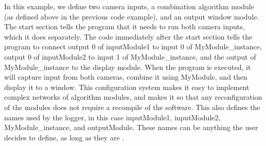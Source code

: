 \documentclass[letterpaper,10pt,titlepage]{IEEEtran}
\begin{document}
   In this example, we define two camera inputs, a combination algorithm module (as defined above in the previous code example), and an output window module. The start section tells the program that it needs to run both camera inputs, which it does separately. The code immediately after the start section tells the program to connect output 0 of inputModule1 to input 0 of MyModule\_instance, output 0 of inputModule2 to input 1 of MyModule\_instance, and the output of MyModule\_instance to the display module. When the program is executed, it will capture input from both cameras, combine it using MyModule, and then display it to a window. This configuration system makes it easy to implement complex networks of algorithm modules, and makes it so that any reconfiguration of the modules does not require a recompile of the software. This also defines the names used by the logger, in this case inputModule1, inputModule2, MyModule\_instance, and outputModule. These names can be anything the user decides to define, as long as they are .
				
   
\end{document}
